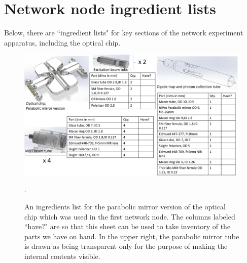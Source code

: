 \chapter{Network node ingredient lists}\label{ch:ingredients}



Below, there are ``ingredient lists" for key sections of the network experiment apparatus, including the optical chip.

\newpage

\begin{figure}
    \centering
    \includegraphics[width=1\textwidth]{Images/optical_chip_parts_mirror_version_20230316.pdf}
    \caption{An ingredients list for the parabolic mirror version of the optical chip which was used in the first network node. The columns labeled ``have?" are so that this sheet can be used to take inventory of the parts we have on hand. In the upper right, the parabolic mirror tube is drawn as being transparent only for the purpose of making the internal contents visible.}.
    \label{fig:drawing_mdc_chamber}
\end{figure}

\newpage